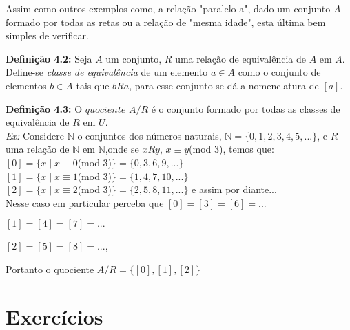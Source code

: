 Assim como outros exemplos como, a relação "paralelo a", dado um conjunto $A$ formado por todas as retas ou a relação de "mesma idade", esta última bem simples de verificar.

\textbf{Definição 4.2:} Seja $A$ um conjunto, $R$ uma relação de equivalência de $A$ em $A$. Define-se \textit{classe de equivalência} de um elemento $a \in A$ como o conjunto de elementos $b \in A$ tais que $bRa$, para esse conjunto se dá a nomenclatura de $[a]$.

\textbf{Definição 4.3:} O $quociente$ $A/R$ é o conjunto formado por todas as classes de equivalência de $R$ em $U$.\\

\textit{Ex:} Considere $\mathbb{N}$ o conjuntos dos números naturais, $\mathbb{N} = \{0,1,2,3,4,5,...\}$, e $R$ uma relação de $\mathbb{N}$ em $\mathbb{N}$,onde se $xRy$, $x \equiv y$(mod 3), temos que:\\

$[0] = \{x \mid x \equiv 0$(mod 3)$\} = \{0,3,6,9,...\}$\\

$[1] = \{x \mid x \equiv 1$(mod 3)$\} = \{1,4,7,10,...\}$\\

$[2] = \{x \mid x \equiv 2$(mod 3)$\} = \{2,5,8,11,...\}$ e assim por diante...\\

Nesse caso em particular perceba que $[0]=[3]=[6]=...$

$[1]=[4]=[7]=...$

$[2]=[5]=[8]=...$,

Portanto o quociente $A/R = \{[0],[1],[2]\}$

\section{Exercícios}

